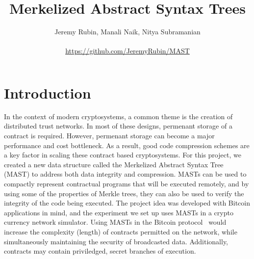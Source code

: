 \documentclass{vldb}
\begin{document}



\title{Merkelized Abstract Syntax Trees}




\author{
\alignauthor Jeremy Rubin, Manali Naik, Nitya Subramanian\\
\vspace{.2cm}
        \\
       \url{https://github.com/JeremyRubin/MAST}}

\maketitle

\section{Introduction}

In the context of modern cryptosystems, a common theme is the creation of
distributed trust networks. In most of these designs, permenant storage of a
contract is required. However, permenant storage can become a major performance
and cost bottleneck. As a result, good code compression schemes are a key
factor in scaling these contract based cryptosystems. For this project, we
created a new data structure called the Merkelized Abstract Syntax Tree (MAST)
to address both data integrity and compression. MASTs can be used to compactly
represent contractual programs that will be executed remotely, and by using
some of the properties of Merkle trees, they can also be used to verify the
integrity of the code being executed. The project idea was developed with
Bitcoin applications in mind, and the experiment we set up uses MASTs in a
crypto currency network simulator. Using MASTs in the Bitcoin
protocol~\cite{bitcoin} would increase the complexity (length) of contracts
permitted on the network, while simultaneously maintaining the security of
broadcasted data. Additionally, contracts may contain priviledged, secret
branches of execution.
\end{document}
